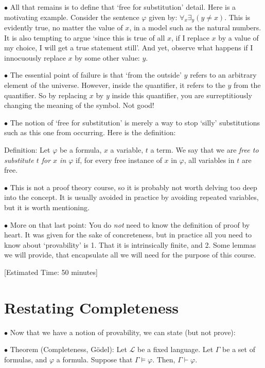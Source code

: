 \documentclass{article}
\newcommand{\Lang}{\mathcal{L}}
\newcommand\point[1]{\noindent \hspace{\labelsep} $\bullet$ #1 \smallskip}
\newcommand\timestamp[1]{\noindent \hspace{\labelsep} [Estimated Time: #1] \smallskip}
\begin{document}
\point{All that remains is to define that `free for substitution' detail. Here is a motivating example. Consider the sentence $\varphi$ given by: $\forall_x \exists_y (y \neq x)$. This is evidently true, no matter the value of $x$, in a model such as the natural numbers. It is also tempting to argue `since this is true of all $x$, if I replace $x$ by a value of my choice, I will get a true statement still'. And yet, observe what happens if I innocuously replace $x$ by some other value: $y$.}

\point{The essential point of failure is that `from the outside' $y$ refers to an arbitrary element of the universe. However, inside the quantifier, it refers to the $y$ from the quantifier. So by replacing $x$ by $y$ inside this quantifier, you are surreptitiously changing the meaning of the symbol. Not good!}

\point{The notion of `free for substitution' is merely a way to stop `silly' substitutions such as this one from occurring. Here is the definition:

Definition: Let $\varphi$ be a formula, $x$ a variable, $t$ a term. We say that we are \emph{free to substitute $t$ for $x$ in $\varphi$} if, for every free instance of $x$ in $\varphi$, all variables in $t$ are free.}

\point{This is not a proof theory course, so it is probably not worth delving too deep into the concept. It is usually avoided in practice by avoiding repeated variables, but it is worth mentioning.}

\point{More on that last point: You do \emph{not} need to know the definition of proof by heart. It was given for the sake of concreteness, but in practice all you need to know about `provability' is 1. That it is intrinsically finite, and 2. Some lemmas we will provide, that encapsulate all we will need for the purpose of this course.}

\timestamp{50 minutes}

\section{Restating Completeness}

\point{Now that we have a notion of provability, we can state (but not prove):}

\point{Theorem (Completeness, Gödel): Let $\Lang$ be a fixed language. Let $\Gamma$ be a set of formulas, and $\varphi$ a formula. Suppose that $\Gamma \vDash \varphi$. Then, $\Gamma \vdash \varphi$.}
\end{document}
